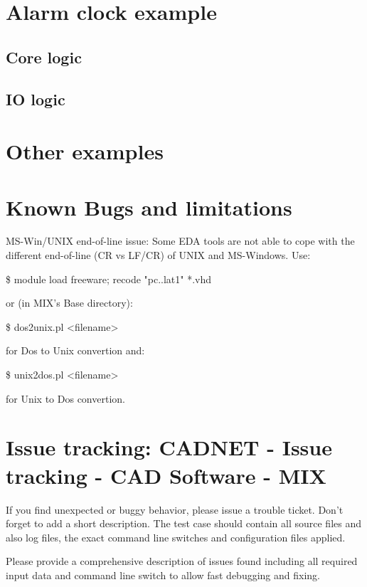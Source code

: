 \documentclass[a4paper,12pt]{article}
\begin{document}
\section{Alarm clock example}
\subsection{Core logic}
\subsection{IO logic}
\section{Other examples}

\section{Known Bugs and limitations}
MS-Win/UNIX end-of-line issue:
Some EDA tools are not able to cope with the\newline
different end-of-line (CR vs LF/CR) of UNIX and MS-Windows. Use:\newline
\hspace*{15mm}\begin{tt}\$ module load freeware; recode "pc..lat1" *.vhd\end{tt}\newline
or (in MIX's Base directory):\newline
\hspace*{15mm}\begin{tt}\$ dos2unix.pl <filename>\end{tt}\newline
for Dos to Unix convertion and:\newline
\hspace*{15mm}\begin{tt}\$ unix2dos.pl <filename>\end{tt}\newline
for Unix to Dos convertion.

\section{Issue tracking: CADNET - Issue tracking - CAD Software - MIX}
If you find unexpected or buggy behavior, please issue a trouble ticket. Don't forget to add a short description. The test case should contain all source files and also log files, the exact command line switches and configuration files applied.\newline
\begin{it}Please provide a comprehensive description of issues found including all required input data and command line switch to allow fast debugging and fixing.\end{it}
\end{document}
